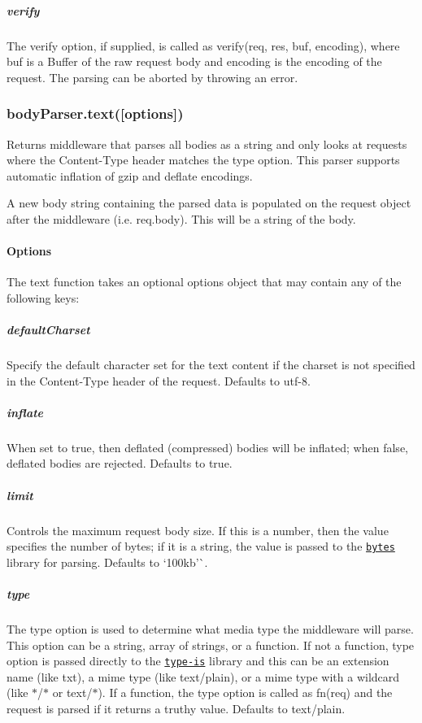 \subparagraph*{verify}

The {\ttfamily verify} option, if supplied, is called as {\ttfamily verify(req, res, buf, encoding)}, where {\ttfamily buf} is a {\ttfamily Buffer} of the raw request body and {\ttfamily encoding} is the encoding of the request. The parsing can be aborted by throwing an error.

\subsubsection*{body\+Parser.\+text(\mbox{[}options\mbox{]})}

Returns middleware that parses all bodies as a string and only looks at requests where the {\ttfamily Content-\/\+Type} header matches the {\ttfamily type} option. This parser supports automatic inflation of {\ttfamily gzip} and {\ttfamily deflate} encodings.

A new {\ttfamily body} string containing the parsed data is populated on the {\ttfamily request} object after the middleware (i.\+e. {\ttfamily req.\+body}). This will be a string of the body.

\paragraph*{Options}

The {\ttfamily text} function takes an optional {\ttfamily options} object that may contain any of the following keys\+:

\subparagraph*{default\+Charset}

Specify the default character set for the text content if the charset is not specified in the {\ttfamily Content-\/\+Type} header of the request. Defaults to {\ttfamily utf-\/8}.

\subparagraph*{inflate}

When set to {\ttfamily true}, then deflated (compressed) bodies will be inflated; when {\ttfamily false}, deflated bodies are rejected. Defaults to {\ttfamily true}.

\subparagraph*{limit}

Controls the maximum request body size. If this is a number, then the value specifies the number of bytes; if it is a string, the value is passed to the \href{https://www.npmjs.com/package/bytes}{\tt bytes} library for parsing. Defaults to `\textquotesingle{}100kb'\`{}.

\subparagraph*{type}

The {\ttfamily type} option is used to determine what media type the middleware will parse. This option can be a string, array of strings, or a function. If not a function, {\ttfamily type} option is passed directly to the \href{https://www.npmjs.org/package/type-is#readme}{\tt type-\/is} library and this can be an extension name (like {\ttfamily txt}), a mime type (like {\ttfamily text/plain}), or a mime type with a wildcard (like {\ttfamily $\ast$/$\ast$} or {\ttfamily text/$\ast$}). If a function, the {\ttfamily type} option is called as {\ttfamily fn(req)} and the request is parsed if it returns a truthy value. Defaults to {\ttfamily text/plain}.

